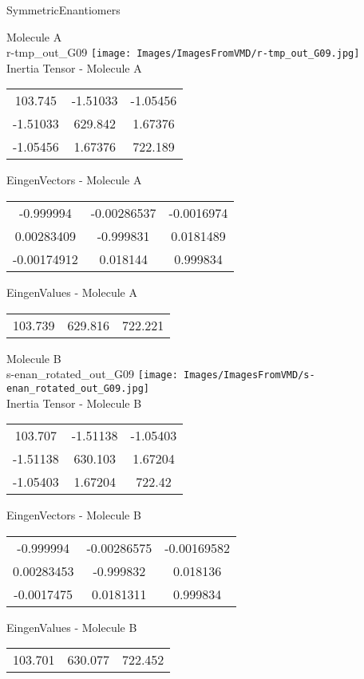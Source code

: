 \vtab[-2cm]
\begin{center}
{\large SymmetricEnantiomers}
\end{center}
\begin{multicols}{2}
\begin{center}
Molecule A \\ 
r-tmp\_out\_G09
\texttt{[image: Images/ImagesFromVMD/r-tmp\_out\_G09.jpg]}
\\
Inertia Tensor - Molecule A \\
\vtab
\begin{tabular}{|c c c|}
103.745	 & 	-1.51033	 & 	-1.05456	 \\
-1.51033	 & 	629.842	 & 	1.67376	 \\
-1.05456	 & 	1.67376	 & 	722.189
\end{tabular}

\vtab
 EingenVectors - Molecule A     \\
\vtab
\begin{tabular}{|c c c|}
-0.999994	 & 	-0.00286537	 & 	-0.0016974	 \\
0.00283409	 & 	-0.999831	 & 	0.0181489	 \\
-0.00174912	 & 	0.018144	 & 	0.999834
\end{tabular}

\vtab
 EingenValues - Molecule A     \\
\vtab
\begin{tabular}{|c c c|}
103.739	 & 	629.816	 & 	722.221
\end{tabular}
\columnbreak

Molecule B \\ 
s-enan\_rotated\_out\_G09
\texttt{[image: Images/ImagesFromVMD/s-enan\_rotated\_out\_G09.jpg]}
\\
Inertia Tensor - Molecule B \\
\vtab
\begin{tabular}{|c c c|}
103.707	 & 	-1.51138	 & 	-1.05403	 \\
-1.51138	 & 	630.103	 & 	1.67204	 \\
-1.05403	 & 	1.67204	 & 	722.42
\end{tabular}

\vtab
 EingenVectors - Molecule B     \\
\vtab
\begin{tabular}{|c c c|}
-0.999994	 & 	-0.00286575	 & 	-0.00169582	 \\
0.00283453	 & 	-0.999832	 & 	0.018136	 \\
-0.0017475	 & 	0.0181311	 & 	0.999834
\end{tabular}

\vtab
 EingenValues - Molecule B     \\
\vtab
\begin{tabular}{|c c c|}
103.701	 & 	630.077	 & 	722.452
\end{tabular}

\end{center}
\end{multicols}
